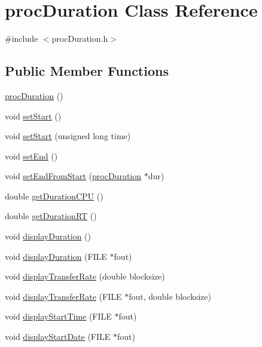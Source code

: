 \hypertarget{classprocDuration}{\section{proc\-Duration Class Reference}
\label{classprocDuration}
}


{\ttfamily \#include $<$proc\-Duration.\-h$>$}

\subsection*{Public Member Functions}
\begin{DoxyCompactItemize}
\item 
\hyperlink{classprocDuration_a350e96d176d438001311caa6b41391de}{proc\-Duration} ()
\item 
void \hyperlink{classprocDuration_aaad4302e83bbccc35b0906de8c0ab531}{set\-Start} ()
\item 
void \hyperlink{classprocDuration_ae0c09d3d0a81c78064e170ee02c38ee3}{set\-Start} (unsigned long time)
\item 
void \hyperlink{classprocDuration_a2baf0a30733d0045318d00ffc8020830}{set\-End} ()
\item 
void \hyperlink{classprocDuration_ae3c5853166d5c2983b1a508a3d783aae}{set\-End\-From\-Start} (\hyperlink{classprocDuration}{proc\-Duration} $\ast$dur)
\item 
double \hyperlink{classprocDuration_aca8f2bc01920b0bc85fcc8001b85854e}{get\-Duration\-C\-P\-U} ()
\item 
double \hyperlink{classprocDuration_a46a4097bb56d4d0694f3a9f39ff4047d}{get\-Duration\-R\-T} ()
\item 
void \hyperlink{classprocDuration_a31422e9f157639271e18d6fcc971418b}{display\-Duration} ()
\item 
void \hyperlink{classprocDuration_a2421fcd5372f2820f3d647b0b9ea7b5b}{display\-Duration} (F\-I\-L\-E $\ast$fout)
\item 
void \hyperlink{classprocDuration_a57e1c97ac11a00b4a752bfae1f13da51}{display\-Transfer\-Rate} (double blocksize)
\item 
void \hyperlink{classprocDuration_a6bc2cd76bfb9e29955c97a67d38767c9}{display\-Transfer\-Rate} (F\-I\-L\-E $\ast$fout, double blocksize)
\item 
void \hyperlink{classprocDuration_accfd22f8d3d3f564b933303cac3034d6}{display\-Start\-Time} (F\-I\-L\-E $\ast$fout)
\item 
void \hyperlink{classprocDuration_a683e15d56ba6c794fa24c2e23f2decb1}{display\-Start\-Date} (F\-I\-L\-E $\ast$fout)

\end{DoxyCompactItemize}
